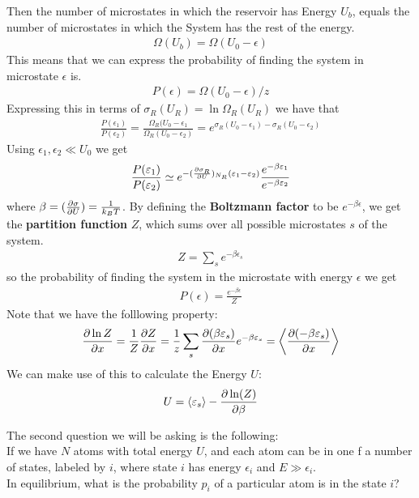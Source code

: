 Then the number of microstates in which the reservoir has Energy $U_b$, equals the number of microstates in which the System has the rest of the energy.
\begin{align*}
	\Omega(U_b) = \Omega(U_0 - \epsilon)
\end{align*}
This means that we can express the probability of finding the system in microstate $\epsilon$ is.
\begin{align*}
	P(\epsilon) = \Omega(U_0 - \epsilon)/z
\end{align*}
Expressing this in terms of $\sigma_R(U_R) = \ln \Omega_R(U_R)$ we have that
\begin{align*}
	\frac{P(\epsilon_1)}{P(\epsilon_2)} = \frac{\Omega_R(U_0 - \epsilon_1}{\Omega_R(U_0 - \epsilon_2)} = e^{\sigma_R(U_0 - \epsilon_1) - \sigma_R(U_0 - \epsilon_2)}
\end{align*}
Using $\epsilon_1, \epsilon_2  \ll U_0$ we get
\begin{align*}
	\frac{P(\varepsilon_1)}{P(\varepsilon_2)} \simeq e^{-(\frac{\partial \sigma_R}{\partial U})_{N_R}(\varepsilon_1 - \varepsilon_2)} \frac{e^{-\beta \varepsilon_1}}{e^{-\beta \varepsilon_2}}
\end{align*}
where $\beta = (\frac{\partial \sigma}{\partial U}) = \frac{1}{k_B T}$.
By defining the \textbf{Boltzmann factor} to be $e^{-\beta \epsilon}$, we get the \textbf{partition function} $Z$, which sums over all possible microstates $s$ of the system.
\begin{align*}
	Z = \sum_{s} e^{-\beta \epsilon_s}
\end{align*}
so the probability of finding the system in the microstate with energy $\epsilon$ we get
\begin{align*}
	P(\epsilon) = \frac{e^{-\beta \epsilon}}{Z}
\end{align*}
Note that we have the folllowing property:
\begin{align*}
	\frac{\partial \ln Z}{\partial x} = \frac{1}{Z} \frac{\partial Z}{\partial x} = \frac{1}{z} \sum_{s} \frac{\partial (\beta \varepsilon_s)}{\partial x} e^{-\beta \varepsilon_s} = \left< \frac{\partial (-\beta \varepsilon_s)}{\partial x}\right>
\end{align*}
We can make use of this to calculate the Energy $U$:
\begin{align*}
	U = 	\left< \varepsilon_s\right> - \frac{\partial \ln(Z)}{\partial \beta}
\end{align*}

The second question we will be asking is the following:\\
If we have $N$ atoms with total energy $U$, and each atom can be in one f a number of states, labeled by $i$, where state $i$ has energy $\epsilon_i$ and $E \gg \epsilon_i$.\\
In equilibrium, what is the probability $p_i$ of a particular atom is in the state $i$?\\

